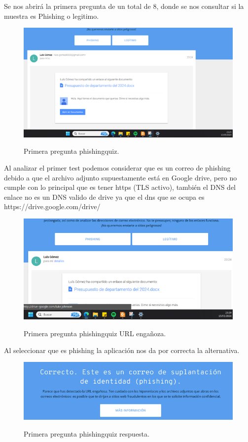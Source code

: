 \documentclass[stu, 11pt, letterpaper, donotrepeattitle, floatsintext, natbib]{apa7}
\begin{document}
Se nos abrirá la primera pregunta de un total de 8, donde se nos consultar si la muestra es Phishing o legitimo.

\begin{figure}[H]
    \centering
    \caption{Primera pregunta phishingquiz.}
    \includegraphics[width=0.75\linewidth]{phishing2.png} %
    \label{fig:OverallEffect}
\end{figure}

Al analizar el primer test podemos considerar que es un correo de phishing debido a que el archivo adjunto supuestamente está en Google drive, pero no cumple con lo principal que es tener https (TLS activo), también el DNS del enlace no es un DNS valido de drive ya que el dns que se ocupa es https://drive.google.com/drive/

\begin{figure}[H]
    \centering
    \caption{Primera pregunta phishingquiz URL engañoza.}
    \includegraphics[width=0.75\linewidth]{phishing3.png} %
    \label{fig:OverallEffect}
\end{figure}

Al seleccionar que es phishing la aplicación nos da por correcta la alternativa.

\begin{figure}[H]
    \centering
    \caption{Primera pregunta phishingquiz respuesta.}
    \includegraphics[width=0.75\linewidth]{phishing4.png} %
    \label{fig:OverallEffect}
\end{figure}
\end{document}
